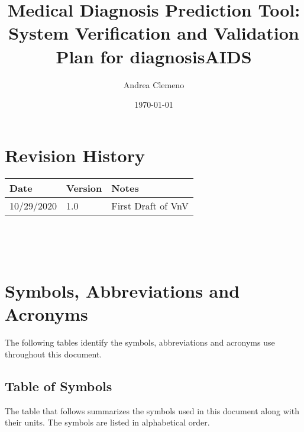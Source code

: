 \documentclass[12pt, titlepage]{article}
\begin{document}
\title{Medical Diagnosis Prediction Tool: System Verification and Validation 
Plan for diagnosisAIDS} 
\author{Andrea Clemeno}
\date{\today}
	
\maketitle


\section{Revision History}

\begin{tabularx}{\textwidth}{p{3cm}p{2cm}X}
\toprule {\bf Date} & {\bf Version} & {\bf Notes}\\
\midrule
10/29/2020 & 1.0 & First Draft of VnV\\
\bottomrule
\end{tabularx}

\newpage

\tableofcontents
~\newpage
\listoftables
~\newpage

\newpage

\section{Symbols, Abbreviations and Acronyms}

The following tables identify the symbols, abbreviations and acronyms use 
throughout this document.
  
\subsection{Table of Symbols}

The table that follows summarizes the symbols used in this document along with
their units. The symbols are listed in alphabetical order.
\end{document}
